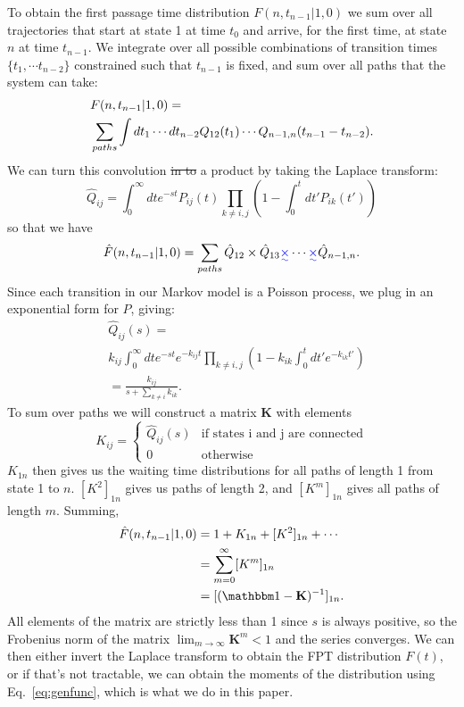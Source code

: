 \documentclass[amsmath, preprintnumbers, 10pt, twocolumn, pre, bibliograpy]{revtex4-1}
\providecommand{\DIFadd}[1]{{\protect\color{blue}\uwave{#1}}} %
\providecommand{\DIFdel}[1]{{\protect\color{red}\sout{#1}}}                      %
\providecommand{\DIFaddbegin}{} %
\providecommand{\DIFaddend}{} %
\providecommand{\DIFdelbegin}{} %
\providecommand{\DIFdelend}{} %
\newcommand{\DIFscaledelfig}{0.5}
\newlength{\DIFdelgraphicswidth} %
\newlength{\DIFdelgraphicsheight} %
\newcommand{\DIFaddincludegraphics}[2][]{{\color{blue}\fbox{\DIFOincludegraphics[#1]{#2}}}} %
\newcommand{\DIFdelincludegraphics}[2][]{%
\sbox{\DIFdelgraphicsbox}{\DIFOincludegraphics[#1]{#2}}%
\settoboxwidth{\DIFdelgraphicswidth}{\DIFdelgraphicsbox} %
\settoboxtotalheight{\DIFdelgraphicsheight}{\DIFdelgraphicsbox} %
\scalebox{\DIFscaledelfig}{%
\parbox[b]{\DIFdelgraphicswidth}{\usebox{\DIFdelgraphicsbox}\\[-\baselineskip] \rule{\DIFdelgraphicswidth}{0em}}\llap{\resizebox{\DIFdelgraphicswidth}{\DIFdelgraphicsheight}{%
\setlength{\unitlength}{\DIFdelgraphicswidth}%
\begin{picture}(1,1)%
\thicklines\linethickness{2pt} %
{\color[rgb]{1,0,0}\put(0,0){\framebox(1,1){}}}%
{\color[rgb]{1,0,0}\put(0,0){\line( 1,1){1}}}%
{\color[rgb]{1,0,0}\put(0,1){\line(1,-1){1}}}%
\end{picture}%
}\hspace*{3pt}}} %
} %
\DeclareRobustCommand{\DIFaddbegin}{\DIFOaddbegin \let\includegraphics\DIFaddincludegraphics} %
\DeclareRobustCommand{\DIFaddend}{\DIFOaddend \let\includegraphics\DIFOincludegraphics} %
\DeclareRobustCommand{\DIFdelbegin}{\DIFOdelbegin \let\includegraphics\DIFdelincludegraphics} %
\DeclareRobustCommand{\DIFdelend}{\DIFOaddend \let\includegraphics\DIFOincludegraphics} %
\begin{document}
To obtain the first passage time distribution $F(n, t_{n-1} | 1, 0)$ we sum over all trajectories that start at state 1 at time $t_0$ and arrive, for the first time, at state $n$ at time $t_{n-1}$. We integrate over all possible combinations of transition times $\{t_1, \cdots t_{n-2}\}$ constrained such that $t_{n-1}$ is fixed, and sum over all paths that the system can take:
\begin{align}
&F(n, t_{n-1}| 1, 0) =  \\
&\sum_{paths} \int dt_1 \cdots dt_{n-2} Q_{12}(t_1) \cdots Q_{n-1, n}(t_{n-1} - t_{n-2}). \notag
\end{align}
We can turn this convolution \DIFdelbegin \DIFdel{in to }\DIFdelend \DIFaddbegin \DIFadd{into }\DIFaddend a product by taking the Laplace transform:
\begin{equation}
\hat Q_{ij} = \int_0^\infty dt e^{-st} P_{ij} (t)  \prod_{k \neq i, j}\left( 1 - \int_0^{t} dt' P_{ik}(t') \right)
\end{equation}
so that we have
\begin{equation}
\hat F(n, t_{n-1}| 1, 0) =\sum_{paths} \hat Q_{12} \times \hat Q_{13}\DIFaddbegin \DIFadd{\times  }\DIFaddend \cdots\DIFaddbegin \DIFadd{\times }\DIFaddend \hat Q_{n-1, n}.
\end{equation}
Since each transition in our Markov model is a Poisson process, we plug in an exponential form for $P$, giving:
\begin{align}
&\hat Q_{ij} (s) = \\
&k_{ij} \int_0^\infty dt e^{-st} e^{-k_{ij}t} \prod_{k \neq i, j}\left( 1 - k_{ik}\int_0^{t} dt' e^{-k_{ik}t'} \right) \\
& =  \frac{k_{ij}}{s+\sum_{k \neq i}k_{ik}}.
\end{align}
To sum over paths we will construct a matrix $\mathbf K$ with elements 
\begin{equation}
K_{ij} = \left\{ \begin{matrix}  \hat Q_{ij} (s) & \text{if states i and j are connected}  \\   0 &  \text{otherwise} \end{matrix} \right.
\end{equation}
$K_{1n}$ then gives us the waiting time distributions for all paths of length 1 from state 1 to $n$. $[K^2]_{1n}$ gives us paths of length 2, and $[K^m]_{1n}$ gives all paths of length $m$. Summing,
\begin{align}
\hat F(n, t_{n-1}| 1, 0) &= 1 + K_{1n} + [K^2]_{1n} + \cdots  \\
&= \sum_{m=0}^\infty [K^m]_{1n} \\
&= [(\mathbbm 1  - \mathbf K)^{-1}]_{1n}.
\end{align}
All elements of the matrix \DIFaddbegin \DIFadd{$\mathbf K$ }\DIFaddend are strictly less than 1 since $s$ is always positive, so the Frobenius norm of the matrix $\lim_{m\to \infty}\mathbf K^m <1$ and the series converges. We can then either invert the Laplace transform to obtain the FPT distribution $F(t)$, or if that's not tractable, we can obtain the moments of the distribution using Eq.~\ref{eq:genfunc}, which is what we do in this paper.
\end{document}
